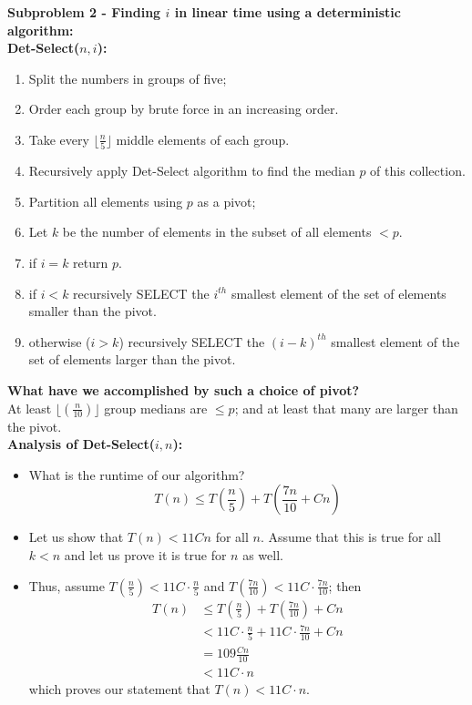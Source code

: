 \documentclass[12pt, letterpaper]{article}
\begin{document}
\textbf{Subproblem 2 - Finding $i$ in linear time using a deterministic algorithm:}\\
\textbf{Det-Select($n,i$):}\\
\begin{enumerate}
    \item Split the numbers in groups of five;
    \item Order each group by brute force in an increasing order.
    \item Take every $\lfloor \frac{n}{5} \rfloor$ middle elements of each group.
    \item Recursively apply Det-Select algorithm to find the median $p$ of this collection.
    \item Partition all elements using $p$ as a pivot;
    \item Let $k$ be the number of elements in the subset of all elements $ < p$.
    \item if $i = k$ return $p$.
    \item if $i < k$ recursively SELECT the $i^{th}$ smallest element of the set of elements smaller than the pivot.
    \item otherwise ($i > k$) recursively SELECT the $(i -k)^{th}$ smallest element of the set of elements larger than the pivot.
\end{enumerate}
\textbf{What have we accomplished by such a choice of pivot?}\\
At least $\lfloor (\frac{n}{10}) \rfloor$ group medians are $\leq p$; and at least that many are larger than the pivot.\\
\textbf{Analysis of Det-Select($i, n$):}\\
\begin{itemize}
    \item What is the runtime of our algorithm? \[T(n) \leq T(\frac{n}{5}) + T(\frac{7n}{10} + Cn)\]
    \item Let us show that $T(n) < 11Cn$ for all $n$. Assume that this is true for all $k < n$ and let us prove it is true for $n$ as well.
    \item Thus, assume $T(\frac{n}{5}) < 11C \cdot \frac{n}{5}$ and $T(\frac{7n}{10}) < 11C \cdot \frac{7n}{10}$; then
    \begin{align*}
        T(n) &\leq T(\frac{n}{5}) + T(\frac{7n}{10}) + Cn\\ &< 11C\cdot \frac{n}{5} + 11C \cdot \frac{7n}{10} + Cn \\
        &= 109\frac{Cn}{10} \\&< 11C \cdot n
    \end{align*}
    which proves our statement that $T(n) < 11C\cdot n$.
\end{itemize}
\end{document}
